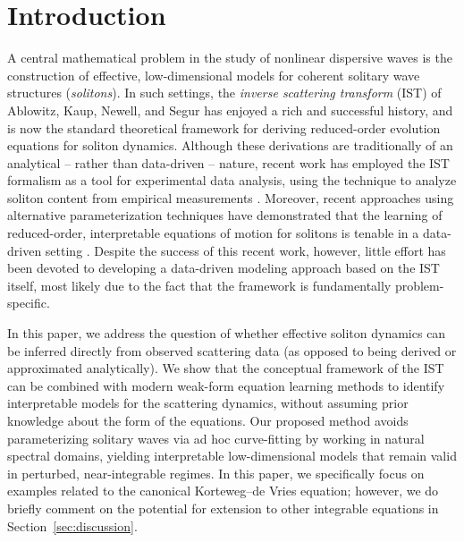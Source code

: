 \documentclass[journal=gmj]{CUP-JNL-DTM}%
\theoremstyle{definition}
\numberwithin{equation}{section}
\begin{document}
\localtableofcontents

\clearpage

\section{Introduction}
A central mathematical problem in the study of nonlinear dispersive waves is the construction of effective, low-dimensional models for coherent solitary wave structures (\textit{solitons}). In such settings, the \textit{inverse scattering transform} (IST) of Ablowitz, Kaup, Newell, and Segur \cite{Ablowitz.etal1974StudApplMath} has enjoyed a rich and successful history, and is now the standard theoretical framework for deriving reduced-order evolution equations for soliton dynamics. Although these derivations are traditionally of an analytical -- rather than data-driven -- nature, recent work has employed the IST formalism as a tool for experimental data analysis, using the technique to analyze soliton content from empirical measurements \cite{Feng.etal2023FrontPhys, Lee.etal2024PLoSONE, Tikan.etal2022SciRep}. Moreover, recent approaches using alternative parameterization techniques have demonstrated that the learning of reduced-order, interpretable equations of motion for solitons is tenable in a data-driven setting \cite{Chen.etal2025ChaosInterdiscipJNonlinearSci, Yang.etal2024FrontPhotonics, Yang.etal2025}. Despite the success of this recent work, however, little effort has been devoted to developing a data-driven modeling approach based on the IST itself, most likely due to the fact that the framework is fundamentally problem-specific.

\smallskip

In this paper, we address the question of whether effective soliton dynamics can be inferred directly from observed scattering data (as opposed to being derived or approximated analytically). We show that the conceptual framework of the IST can be combined with modern weak-form equation learning methods to identify interpretable models for the scattering dynamics, without assuming prior knowledge about the form of the equations. Our proposed method avoids parameterizing solitary waves via ad hoc curve-fitting by working in natural spectral domains, yielding interpretable low-dimensional models that remain valid in perturbed, near-integrable regimes. In this paper, we specifically focus on examples related to the canonical Korteweg--de Vries equation; however, we do briefly comment on the potential for extension to other integrable equations in Section~\ref{sec:discussion}.
\end{document}
